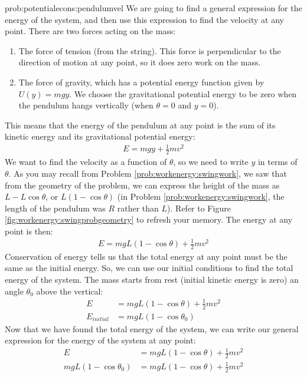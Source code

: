 \begin{solution}{prob:potentialecons:pendulumvel}\label{soln:potentialecons:pendulumvel}
We are going to find a general expression for the energy of the system, and then use this expression to find the velocity at any point. There are two forces acting on the mass:
\begin{enumerate}
\item The force of tension (from the string). This force is perpendicular to the direction of motion at any point, so it does zero work on the mass. 
\item The force of gravity, which has a potential energy function given by $U(y)=mgy$. We choose the gravitational potential energy to be zero when the pendulum hangs vertically (when $\theta=0$ and $y=0$). 
\end{enumerate}
This means that the energy of the pendulum at any point is the sum of its kinetic energy and its gravitational potential energy:
\begin{align*}
E=mgy+\frac{1}{2}mv^2
\end{align*}
We want to find the velocity as a function of $\theta$, so we need to write $y$ in terms of $\theta$. As you may recall from Problem \ref{prob:workenergy:swingwork}, we saw that from the geometry of the problem, we can express the height of the mass as $L-L\cos\theta$, or $L(1-\cos\theta)$ (in Problem \ref{prob:workenergy:swingwork}, the length of the pendulum was $R$ rather than $L$). Refer to Figure \ref{fig:workenergy:swingprobgeometry} to refresh your memory. The energy at any point is then:
\begin{align*}
E=mgL(1-\cos\theta)+\frac{1}{2}mv^2
\end{align*}
Conservation of energy tells us that the total energy at any point must be the same as the initial energy. So, we can use our initial conditions to find the total energy of the system. The mass starts from rest (initial kinetic energy is zero) an angle $\theta_0$ above the vertical:
\begin{align*}
E&=mgL(1-\cos\theta)+\frac{1}{2}mv^2\\
E_{initial}&=mgL(1-\cos\theta_0)
\end{align*} 
Now that we have found the total energy of the system, we can write our general expression for the energy of the system at any point:
\begin{align*}
E&=mgL(1-\cos\theta)+\frac{1}{2}mv^2\\
mgL(1-\cos\theta_0)&=mgL(1-\cos\theta)+\frac{1}{2}mv^2
\end{align*}

\end{solution}
